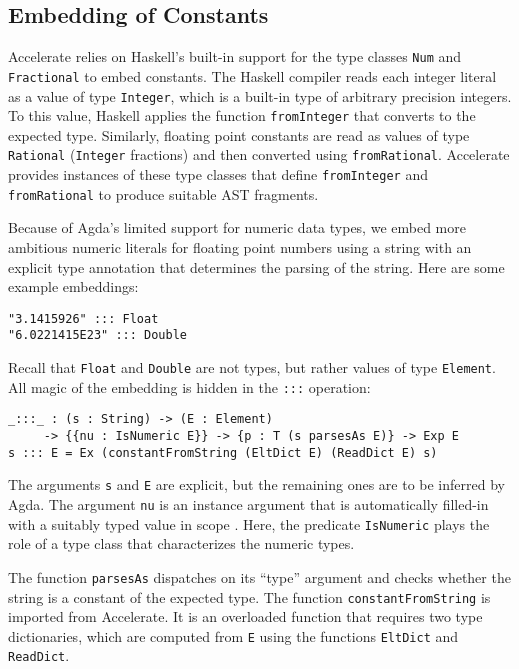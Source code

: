 \documentclass{llncs}
\begin{document}
\subsection{Embedding of Constants}
\label{sec:embedding-constants}


Accelerate relies on Haskell's built-in support for the type classes
\texttt{Num} and \texttt{Fractional} to embed constants. The Haskell compiler reads each integer
literal as a value of type \texttt{Integer}, which is a built-in type
of arbitrary precision integers. To this value, Haskell applies the
function \texttt{fromInteger} that converts to the expected
type. Similarly, floating point constants are read as values of
type \texttt{Rational} (\texttt{Integer} fractions) and then converted
using \texttt{fromRational}. Accelerate provides instances of
these type classes that define \texttt{fromInteger} and
\texttt{fromRational} to produce suitable AST fragments.

Because of Agda's limited support for numeric data types,
we embed more ambitious numeric literals for floating point numbers
using a string with an explicit type annotation that determines the
parsing of the string. Here are some example embeddings:
\begin{verbatim}
"3.1415926" ::: Float
"6.0221415E23" ::: Double
\end{verbatim}
Recall that \texttt{Float} and \texttt{Double} are not
types, but rather values of type \texttt{Element}.
All magic of the embedding is hidden in the \texttt{:::} operation:
\begin{verbatim}
_:::_ : (s : String) -> (E : Element) 
     -> {{nu : IsNumeric E}} -> {p : T (s parsesAs E)} -> Exp E
s ::: E = Ex (constantFromString (EltDict E) (ReadDict E) s)
\end{verbatim}
The arguments \texttt{s} and \texttt{E} are explicit, but the
remaining ones are to be inferred by Agda.
The argument \texttt{nu} is an instance argument that is automatically
filled-in with a suitably typed value in scope
\cite{DevriesePiessens2011}. Here, the predicate 
\texttt{IsNumeric} plays the role of a type class that characterizes
the numeric types.

The function \texttt{parsesAs} dispatches on its ``type'' argument and
checks whether the string is a constant of the expected type. The
function \texttt{constantFromString} is imported from Accelerate.
It is an overloaded function that requires two type dictionaries,
which are computed from \texttt{E} using the functions \texttt{EltDict}
and \texttt{ReadDict}. 
\end{document}
